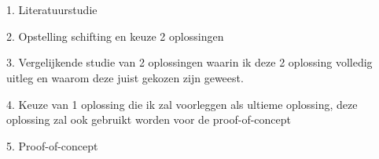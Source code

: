 
\chapter{}
\label{ch:methodologie}


1. Literatuurstudie

2. Opstelling schifting en keuze 2 oplossingen

3. Vergelijkende studie van 2 oplossingen waarin ik deze 2 oplossing volledig uitleg en waarom deze juist gekozen zijn geweest.

4. Keuze van 1 oplossing die ik zal voorleggen als ultieme oplossing, deze oplossing zal ook gebruikt worden voor de proof-of-concept

5. Proof-of-concept

\lipsum[21-25]

